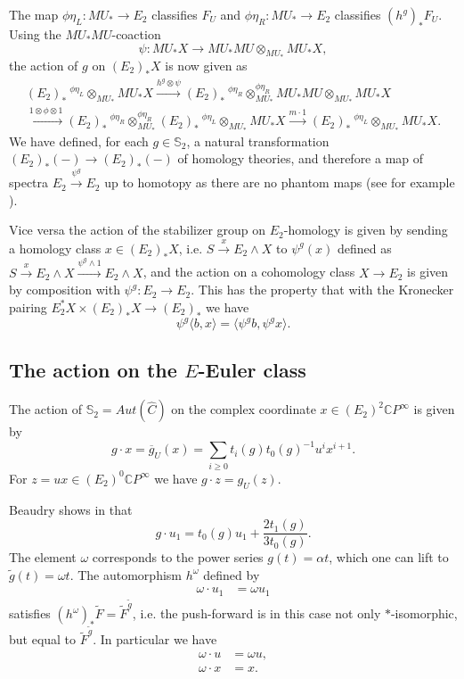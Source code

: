 \documentclass{amsart}
\renewcommand{\S}{{\mathbb S}}
\newcommand {\C}{{\mathbb C}}
\numberwithin{equation}{section}
\theoremstyle{definition}  %
\newtheorem{set theory}[thm]{Set Theoretic Prelude}
\begin{document}
The map $\phi\eta_L:MU_*\to E_2$ classifies $F_U$ and $\phi\eta_R:MU_*\to E_2$ classifies $(h^g)_*F_U$.
Using the $MU_*MU$-coaction $$\psi:MU_*X\to MU_*MU\otimes_{MU_*} MU_*X,$$ the action of $g$ on $(E_2)_*X$ is now given as
\begin{align*}
(E_2)_*\ ^{\phi\eta_L}\otimes_{MU_*} MU_*X \stackrel{h^g\otimes \psi}\longrightarrow (E_2)_*\ ^{\phi\eta_R}\otimes_{MU_*}^{\phi\eta_R} MU_*MU\otimes_{MU_*} MU_*X \\
\stackrel{1\otimes \phi\otimes 1}\longrightarrow
(E_2)_*\ ^{\phi\eta_R}\otimes_{MU_*}^{\phi\eta_R} (E_2)_*\ ^{\phi\eta_L}\otimes_{MU_*} MU_*X \stackrel{m\cdot 1}\longrightarrow (E_2)_*\ ^{\phi\eta_L}\otimes_{MU_*} MU_*X.
\end{align*}
We have defined, for each $g\in \S_2$, a natural transformation $(E_2)_*(-)\to (E_2)_*(-)$ of homology theories, and therefore
a map of spectra $E_2\stackrel{\psi^g}\to E_2$ up to homotopy as there are no phantom maps (see for example \cite[Theorem 4c]{MR1235295}). 

Vice versa the action of the stabilizer group on $E_2$-homology is given by sending a homology class
$x\in (E_2)_*X$, i.e. $S\stackrel{x}\to E_2\wedge X$ to $\psi^g(x)$ defined as $S\stackrel{x}\to E_2\wedge X\stackrel{\psi^g\wedge 1}\to E_2\wedge X$,
and the action on a cohomology class $X\to E_2$ is given by composition with $\psi^g:E_2 \to E_2$.
This has the property that with the Kronecker pairing $E_2^*X\times (E_2)_*X \to (E_2)_*$ we have
$$\psi^g\langle b,x\rangle =\langle  \psi^g b,  \psi^g x \rangle.$$

\subsection{The action on the $E$-Euler class}

The action of $\S_2=Aut(\hat{C})$ on the complex coordinate $x\in (E_2)^2\C P^\infty$
is given by $$g\cdot x=\overline{g}_U(x)=\sum_{i\ge 0} t_i(g)t_0(g)^{-1}u^{i}x^{i+1}.$$
For $z=ux\in (E_2)^0\C P^\infty$ we have $g\cdot z =g_U(z)$.

Beaudry shows in \cite{MR3450774} that $$g\cdot u_1=t_0(g)u_1+\frac{2t_1(g)}{3t_0(g)}.$$
The element $\omega$ 
corresponds to the power series $g(t)=\alpha t$, which one can lift to $\tilde{g}(t)=\omega t$.
The automorphism $h^\omega$ defined by 
\begin{align*}
\omega\cdot u_1&=\omega u_1
\end{align*}
satisfies $(h^{\omega})_*\tilde{F}=\tilde{F}^{\tilde{g}}$, i.e. the push-forward is in this case not only $*$-isomorphic, but equal to $\tilde{F}^{\tilde{g}}$.
In particular we have 
\begin{align*}
\omega\cdot u &=\omega u,\\ 
\omega\cdot x &= x. 
\end{align*}
\end{document}
